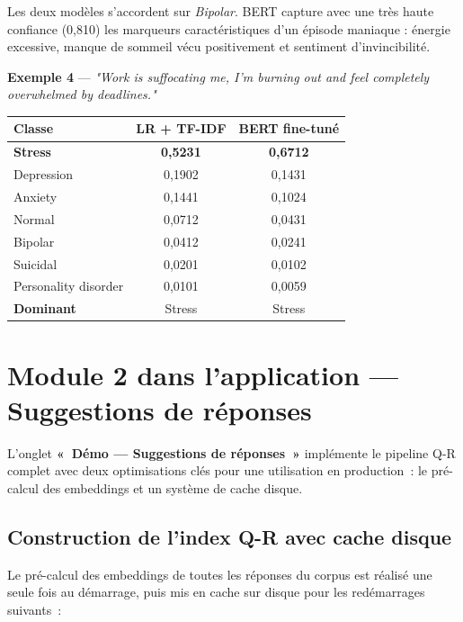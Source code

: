 \documentclass[12pt,a4paper]{report}
\begin{document}
\begin{note}[Interprétation]
Les deux modèles s'accordent sur \textit{Bipolar}. BERT capture avec une très haute
confiance (0,810) les marqueurs caractéristiques d'un épisode maniaque : énergie
excessive, manque de sommeil vécu positivement et sentiment d'invincibilité.
\end{note}

\bigskip

\textbf{Exemple 4} — \textit{"Work is suffocating me, I'm burning out and feel completely
overwhelmed by deadlines."}

\begin{center}
\begin{tabular}{@{}lcc@{}}
\toprule
\textbf{Classe} & \textbf{LR + TF-IDF} & \textbf{BERT fine-tuné} \\
\midrule
\textbf{Stress}        & \textbf{0,5231} & \textbf{0,6712} \\
Depression             & 0,1902          & 0,1431 \\
Anxiety                & 0,1441          & 0,1024 \\
Normal                 & 0,0712          & 0,0431 \\
Bipolar                & 0,0412          & 0,0241 \\
Suicidal               & 0,0201          & 0,0102 \\
Personality disorder   & 0,0101          & 0,0059 \\
\midrule
\textbf{Dominant} & Stress & Stress \\
\bottomrule
\end{tabular}
\end{center}

\section{Module 2 dans l'application — Suggestions de réponses}

L'onglet \textbf{«~Démo — Suggestions de réponses~»} implémente le pipeline Q-R complet
avec deux optimisations clés pour une utilisation en production~: le pré-calcul des
embeddings et un système de cache disque.

\subsection{Construction de l'index Q-R avec cache disque}

Le pré-calcul des embeddings de toutes les réponses du corpus est réalisé une seule
fois au démarrage, puis mis en cache sur disque pour les redémarrages suivants~:
\end{document}
